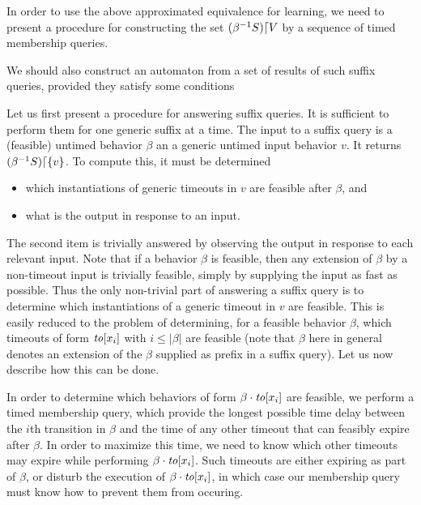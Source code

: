 
In order to use the above approximated equivalence for learning, we need to
present a procedure for constructing the set
$({\beta}^{-1}{S})\lceil{V}$ by a sequence of timed membership queries.

We should also construct an automaton from a set of results of such
suffix queries, provided they satisfy some conditions

Let us first present a procedure for answering suffix queries. It is
sufficient to perform them for one generic suffix at a time.
The input to a suffix query is a (feasible) untimed behavior $\beta$ an a
generic untimed input behavior $v$. It returns
$({\beta}^{-1}{S})\lceil{\lbrace v\rbrace}$. To compute this, it must be determined
\begin{itemize}
\item which instantiations of generic timeouts in $v$ are feasible after $\beta$, and
\item what is the output in response to an input.
\end{itemize}
The second item is trivially answered by observing the output in response to
each relevant input. Note that if a behavior $\beta$ is feasible, then
any extension of $\beta$ by a non-timeout input is trivially feasible, simply
by supplying the input as fast as possible. Thus the only non-trivial part
of answering a suffix query is to determine which instantiations of a generic
timeout in $v$ are feasible. This is easily reduced to the problem of
determining, for a feasible behavior $\beta$, which timeouts of form
$\mathit{to}[x_i]$ with $i \leq |\beta|$ are feasible (note that $\beta$ here in
general denotes an extension of the $\beta$ supplied as prefix in a
suffix query). Let us now describe how this can be done.

In order to determine which behaviors of form $\beta \cdot \mathit{to}[x_i]$
are feasible, we perform a timed membership query, which provide the longest
possible time delay between the $i$th transition in $\beta$ and the time
of any other timeout that can feasibly expire after $\beta$. In order to
maximize this time, we need to know which other timeouts may expire while
performing $\beta \cdot \mathit{to}[x_i]$. Such timeouts are either expiring
as part of $\beta$, or disturb the execution of $\beta \cdot \mathit{to}[x_i]$,
in which case our membership query must know how to prevent them from occuring.

